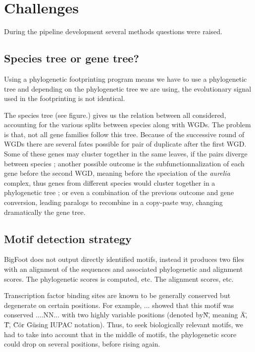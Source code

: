 \section*{Challenges}

During the pipeline development several methods questions were raised.

\subsection*{Species tree or gene tree?}

Using a phylogenetic footprinting program means we have to use a phylogenetic tree and depending on the phylogenetic tree we are using, the evolutionary signal used in the footprinting is not identical.

The species tree (see figure.) gives us the relation between all considered, accounting for the various splits between species along with WGDs. The problem is that, not all gene families follow this tree. Because of the successive round of WGDs there are several fates possible for pair of duplicate after the first WGD. Some of these genes may cluster together in the same leaves, if the pairs diverge between species ; another possible outcome is the subfunctionnalization of each gene before the second WGD, meaning before the speciation of the \textit{aurelia} complex, thus genes from different species would cluster together in a phylogenetic tree ; or even a combination of the previous outcome and gene conversion, leading paralogs to recombine in a copy-paste way, changing dramatically the gene tree.


\subsection*{Motif detection strategy}


BigFoot does not output directly identified motifs, instead it produces two files with an alignment of the sequences and associated phylogenetic and alignment scores. The phylogenetic scores is computed, etc. The alignment scores, etc.

Transcription factor binding sites are known to be generally conserved but degenerate on certain positions. For example, ... showed that this motif was conserved ....NN... with two highly variable positions (denoted by\"N\", meaning \"A\", \"T\", \"C\" or \"G\" using IUPAC notation). Thus, to seek biologically relevant motifs, we had to take into account that in the middle of motifs, the phylogenetic score could drop on several positions, before rising again.

